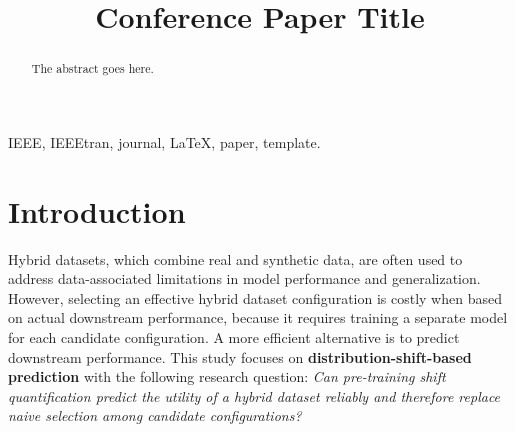 \documentclass[conference]{IEEEtran}
\begin{document}
\title{Conference Paper Title}

\author{
\and
{}
\and
{}
\and
{}
\and
{}
}

\maketitle

\begin{abstract}
The abstract goes here.
\end{abstract}

\begin{IEEEkeywords}
IEEE, IEEEtran, journal, \LaTeX, paper, template.
\end{IEEEkeywords}

\section{Introduction}
Hybrid datasets, which combine real and synthetic data, are often used to address data-associated limitations in model performance and generalization. However, selecting an effective hybrid dataset configuration is costly when based on actual downstream performance, because it requires training a separate model for each candidate configuration. A more efficient alternative is to predict downstream performance. This study focuses on \textbf{distribution-shift-based prediction} with the following research question: \textit{Can pre-training shift quantification predict the utility of a hybrid dataset reliably and therefore replace naive selection among candidate configurations?}\\
\end{document}
